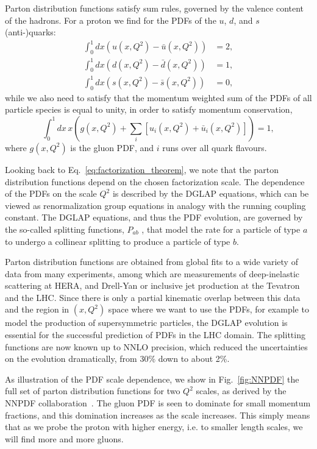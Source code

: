 Parton distribution functions satisfy sum rules, governed by the valence content of the
hadrons. For a proton we find for the PDFs of the $u$, $d$,
and $s$ (anti-)quarks: 
\begin{align}
  \int_0^1 dx \left( u(x,Q^2) - \bar{u}(x,Q^2)\right) &= 2, \\[-2pt]
  \int_0^1 dx \left( d(x,Q^2) - \bar{d}(x,Q^2)\right) &= 1, \\[-2pt]
  \int_0^1 dx \left( s(x,Q^2) - \bar{s}(x,Q^2)\right) &= 0, 
\end{align}
while we also need to satisfy that the momentum weighted sum of the PDFs of all particle species is
equal to unity, in order to satisfy momentum conservation, 
\begin{equation}
  \int_0^1 dx \, x \left( g(x,Q^2) + \sum_i [u_i(x,Q^2) + \bar{u}_i(x,Q^2)]\right) = 1 ,
\end{equation}
where $g(x,Q^2)$ is the gluon PDF, and $i$ runs over all quark flavours. 

Looking back to Eq.~\ref{eq:factorization_theorem}, we note that the parton distribution
functions depend on the chosen factorization scale. The dependence of the PDFs on the scale $Q^2$
is described by the DGLAP equations, which can be viewed as renormalization group equations in
analogy with the running coupling constant. 
The DGLAP equations, and thus the PDF evolution, are governed by the so-called splitting functions,
$P_{ab}$ , that model the rate for a particle of type $a$ to undergo a collinear splitting to
produce a particle of type $b$. 

Parton distribution functions are obtained from global fits to a wide variety of data from
many experiments, among which are measurements of deep-inelastic scattering at HERA, and Drell-Yan
or inclusive jet production at the Tevatron and the LHC. 
Since there is only a partial kinematic overlap between this data and the region in $(x,Q^2)$ space
where we want to use the PDFs, for example to model the production of supersymmetric particles,
the DGLAP evolution is essential for the successful prediction of PDFs in the LHC domain. 
The splitting functions are now known up to NNLO precision, which reduced the uncertainties on the
evolution dramatically, from 30\% down to about 2\%.

As illustration of the PDF scale dependence, we show in Fig.~\ref{fig:NNPDF} the full
set of parton distribution functions for two $Q^2$ scales, as derived by the \textsc{NNPDF}
collaboration~\cite{Ball:2012cx}. 
The gluon PDF is seen to dominate for small momentum fractions, and this domination increases as the
scale increases. This simply means that as we probe the proton with higher energy, i.e. to smaller
length scales, we will find more and more gluons. 

